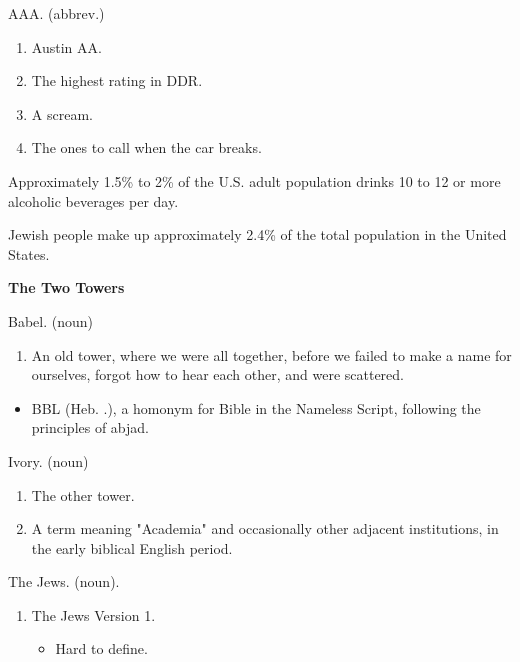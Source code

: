 
\Sentence
{ \hX{} }
{ \eX{} }
{
AAA. (abbrev.)
\begin{enumerate}
\item Austin AA.
\item The highest rating in DDR.
\item A scream.
\item The ones to call when the car breaks.
\end{enumerate}
}

\Sentence
{ \hX{} }
{ \eX{} }
{
Approximately 1.5\% to 2\% of the U.S. adult population drinks 10 to 12 or more alcoholic beverages per day.
}

\Sentence
{ \hX{} }
{ \eX{} }
{
Jewish people make up approximately 2.4\% of the total population in the United States.
}

\Sentence
{ \hX{} }
{ \eX{} }
{ \textbf{The Two Towers} }

\Sentence
{ \hX{} }
{ \eX{} }
{
Babel. (noun)
\begin{enumerate}
\item An old tower, where we were all together, before we failed to make a name for ourselves, forgot how to hear each other, and were scattered.
\end{enumerate}
\begin{itemize}
\item BBL (Heb. .), a homonym for Bible in the Nameless Script, following the principles of abjad.
\end{itemize}
}

\Sentence
{ \hX{} }
{ \eX{} }
{
Ivory. (noun)
\begin{enumerate}
\item The other tower.
\item A term meaning "Academia" and occasionally other adjacent institutions, in the early biblical English period.
\end{enumerate}
}

\Sentence
{ \hX{} }
{ \eX{} }
{
The Jews. (noun).
}

\Sentence
{ \hX{} }
{ \eX{} }
{
\begin{enumerate}
\item[1.] The Jews Version 1.
\begin{itemize}
\item Hard to define.
\end{itemize}
\end{enumerate}
}

